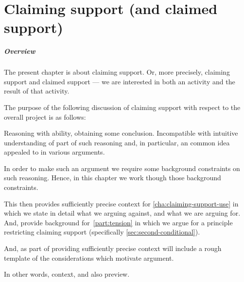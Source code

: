 \chapter{Claiming support (and claimed support)}
\label{sec:abil-access-supp}

\paragraph*{Overview}

\begin{note}
  The present chapter is about claiming support.
  Or, more precisely, claiming support and claimed support --- we are interested in both an activity and the result of that activity.

  The purpose of the following discussion of claiming support with respect to the {\color{red} overall project} is as follows:

  Reasoning with ability, obtaining some conclusion.
  Incompatible with intuitive understanding of part of such reasoning and, in particular, an common idea appealed to in various arguments.

  In order to make such an argument we require some background constraints on such reasoning.
  Hence, in this chapter we work though those background constraints.

  This then provides sufficiently precise context for \autoref{cha:claiming-support-use} in which we state in detail what we arguing against, and what we are arguing for.
  And, provide background for~\autoref{part:tension} in which we argue for a principle restricting claiming support (specifically \autoref{sec:second-conditional}).

  And, as part of providing sufficiently precise context will include a rough template of the considerations which motivate argument.

  In other words, context, and also preview.
\end{note}


